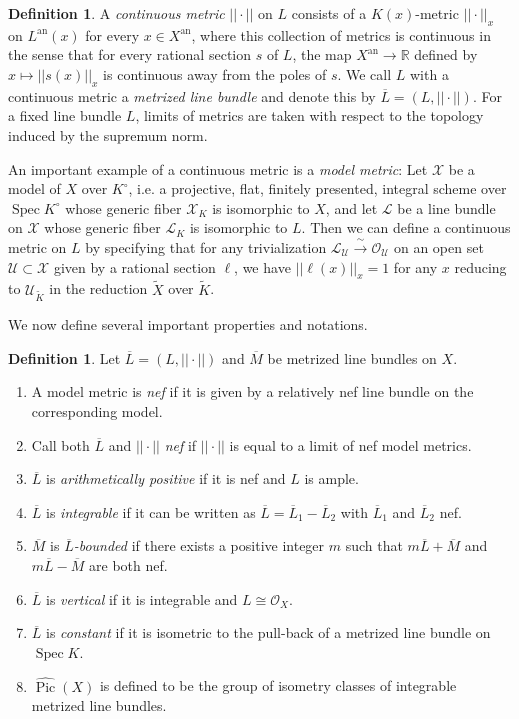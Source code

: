 \documentclass[times, doublespace]{amsart}
\numberwithin{equation}{section}
\theoremstyle{plain}
\theoremstyle{definition}
\newtheorem{definition}[equation]{Definition}
\DeclareMathOperator{\Spec}{Spec}
\DeclareMathOperator{\Pic}{Pic}
\DeclareMathOperator{\an}{an}
\newcommand{\isom}{\xrightarrow{~\sim~}}
\newcommand{\semipositive}{nef}
\newcommand{\R}{\mathbb{R}}
\newcommand{\cO}{\mathcal{O}}
\newcommand{\cX}{\mathcal{X}}
\newcommand{\cU}{\mathcal{U}}
\newcommand{\calL}{\mathcal{L}}
\begin{document}
\begin{definition}
A \emph{continuous metric} $||\cdot||$ on $L$ consists of a $K(x)$-metric $||\cdot||_x$ on $L^{\an}(x)$ for every $x\in X^{\an}$, where this collection of metrics is continuous in the sense that for every rational section $s$ of $L$, the map $X^{\an}\to\R$ defined by $x\mapsto||s(x)||_x$ is continuous away from the poles of $s$. We call $L$ with a continuous metric a \emph{metrized line bundle} and denote this by $\overline L=(L,||\cdot||)$. For a fixed line bundle $L$, limits of metrics are taken with respect to the topology induced by the supremum norm.


An important example of a continuous metric is a \emph{model metric}: Let $\cX$ be a model of $X$ over $K^{\circ}$, i.e. a projective, flat, finitely presented, integral scheme over $\Spec K^{\circ}$ whose generic fiber $\cX_K$ is isomorphic to $X$, and let $\calL$ be a line bundle on $\cX$ whose generic fiber $\calL_K$ is isomorphic to $L$. Then we can define a continuous metric on $L$ by specifying that for any trivialization $\calL_{\cU}\isom\cO_{\cU}$ on an open set $\cU\subset\cX$ given by a rational section $\ell$,
we have $||\ell(x)||_x=1$ for any $x$ reducing to $\cU_{\widetilde K}$ in the reduction $\widetilde X$ over $\widetilde K$. 
\end{definition}

We now define several important properties and notations.

\begin{definition}\label{metrizedprops}
Let $\overline L=(L,||\cdot||)$ and $\overline M$ be metrized line bundles on $X$.
\begin{enumerate}
\item
A model metric is \emph{\semipositive{}} if it is given by a relatively nef line bundle on the corresponding model.
\item
Call both $\overline L$ and $||\cdot||$ \emph{\semipositive{}} if $||\cdot||$ is equal to a limit of \semipositive{} model metrics.
\item
$\overline L$ is \emph{arithmetically positive} if it is \semipositive{} and $L$ is ample.
\item
$\overline L$ is \emph{integrable} if it can be written as $\overline L=\overline L_1-\overline L_2$ with $\overline L_1$ and $\overline L_2$ \semipositive{}.
\item
$\overline M$ is \emph{$\overline L$-bounded} if there exists a positive integer $m$ such that $m\overline L+\overline M$ and $m\overline L-\overline M$ are both \semipositive{}.
\item
$\overline L$ is \emph{vertical} if it is integrable and $L\cong\cO_X$.
\item
$\overline L$ is \emph{constant} if it is isometric to the pull-back of a metrized line bundle on $\Spec K$.
\item
$\widehat{\Pic}(X)$ is defined to be the group of isometry classes of integrable metrized line bundles.
\end{enumerate}
\end{definition}
\end{document}
